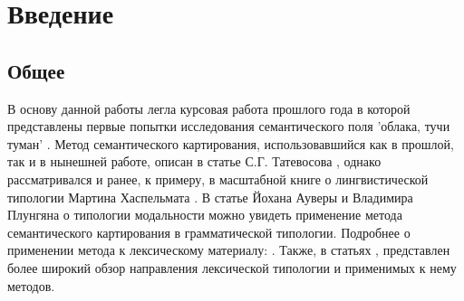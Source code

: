 
\usepackage{alltt}
\usepackage{bibunits}
\usepackage{enumitem}
\usepackage{ltablex,booktabs}


{
  \hypersetup{linkcolor=black}
  \tableofcontents
}
\pagebreak

\section{Введение} 
\subsection{Общее} \label{preview}

\par В основу данной работы легла курсовая работа прошлого года в которой представлены первые попытки исследования семантического поля 'облака, тучи туман' \citep{соколовский2017}. Метод семантического картирования, использовавшийся как в прошлой, так и в нынешней работе, описан в статье С.Г. Татевосова \citep{татевосов2004}, однако рассматривался и ранее, к примеру, в масштабной книге о лингвистической типологии Мартина Хаспельмата \citep{haspelmath2001language}. В статье Йохана Ауверы и Владимира Плунгяна о типологии модальности \citep{van1998modality} можно увидеть применение метода семантического картирования в грамматической типологии. Подробнее о применении метода к лексическому материалу: \citep{рр2013}. Также, в статьях \citep{krv2015}, \citep{плунгян2007} представлен более широкий обзор направления лексической типологии и применимых к нему методов.

